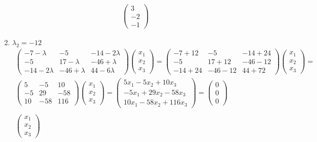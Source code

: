 \begin{enumerate}
\begin{gather*}
\begin{pmatrix}
					3 \\ -2 \\ -1
				\end{pmatrix}
			\end{gather*}
		\item $\lambda_2 = -12$
			\begin{gather*}
				\begin{pmatrix}
					-7-\lambda & -5 & -14-2\lambda\\
					-5 & 17-\lambda & -46+\lambda\\
					-14-2\lambda & -46+\lambda & 44-6\lambda
				\end{pmatrix}	
				\begin{pmatrix}
					x_1 \\ x_2 \\ x_3
				\end{pmatrix}
				=
				\begin{pmatrix}
					-7+12 & -5 & -14+24\\
					-5 & 17+12 & -46-12\\
					-14+24 & -46-12 & 44+72
				\end{pmatrix}	
				\begin{pmatrix}
					x_1 \\ x_2 \\ x_3
				\end{pmatrix}
				=\\
				\begin{pmatrix}
					5 & -5 & 10\\
					-5 & 29 & -58\\
					10 & -58 & 116
				\end{pmatrix}	
				\begin{pmatrix}
					x_1 \\ x_2 \\ x_3
				\end{pmatrix}
				=
				\begin{pmatrix}
					5x_1 -5x_2  +10x_3\\
					-5x_1 +29x_2  -58x_3\\
					10x_1  -58x_2 +116x_3
				\end{pmatrix}
				=
				\begin{pmatrix}
					0 \\ 0 \\ 0
				\end{pmatrix}\\
				\\
				\begin{pmatrix}
					x_1 \\ x_2 \\ x_3

\end{pmatrix}
\end{gather*}
\end{enumerate}
